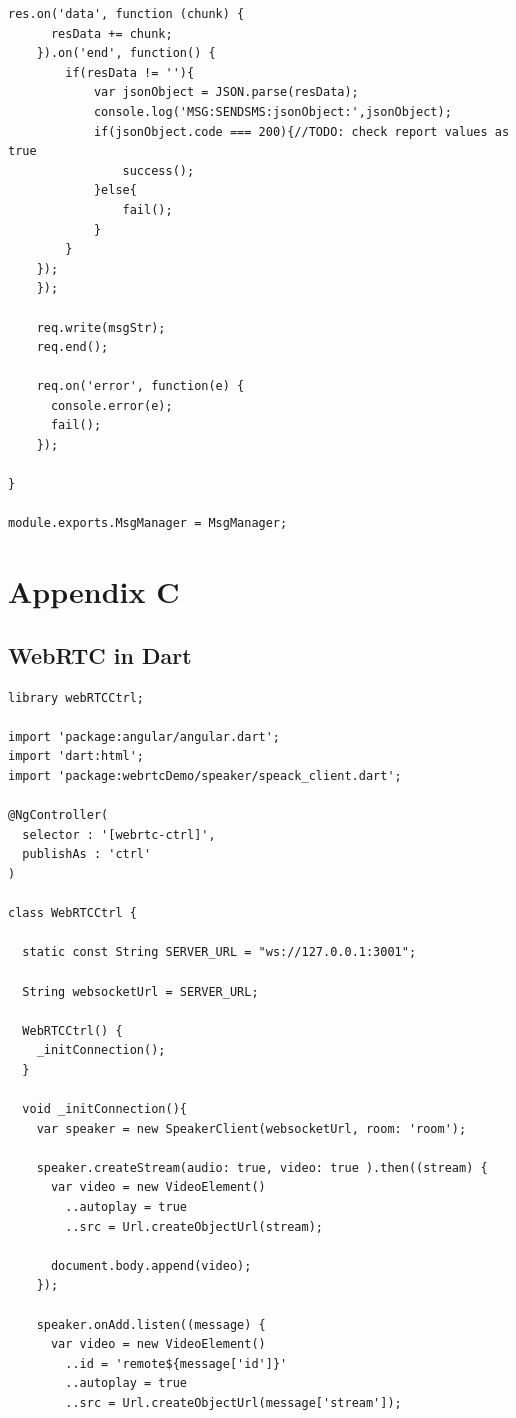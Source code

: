 \begin{appendices}
\begin{lstlisting}[caption={msg.js on Application Server},label={code:msg}]
	  res.on('data', function (chunk) {
      resData += chunk;
    }).on('end', function() {
    	if(resData != ''){
    		var jsonObject = JSON.parse(resData);
    		console.log('MSG:SENDSMS:jsonObject:',jsonObject);
    		if(jsonObject.code === 200){//TODO: check report values as true
    			success();
    		}else{
    			fail();
    		}
    	}
    });
	});

	req.write(msgStr);
	req.end();

	req.on('error', function(e) {
	  console.error(e);
	  fail();
	});

}

module.exports.MsgManager = MsgManager;
\end{lstlisting}

\chapter{Appendix C}

\section{WebRTC in Dart} 
\label{research:dart_webrtcctrl}

\begin{lstlisting}[caption={WebRTCCtrl in Dart application client},label={code:dart_webrtcctrl}]
library webRTCCtrl;

import 'package:angular/angular.dart';
import 'dart:html';
import 'package:webrtcDemo/speaker/speack_client.dart';

@NgController(
  selector : '[webrtc-ctrl]',
  publishAs : 'ctrl'
)

class WebRTCCtrl {

  static const String SERVER_URL = "ws://127.0.0.1:3001";

  String websocketUrl = SERVER_URL;

  WebRTCCtrl() {
    _initConnection();
  }

  void _initConnection(){
    var speaker = new SpeakerClient(websocketUrl, room: 'room');

    speaker.createStream(audio: true, video: true ).then((stream) {
      var video = new VideoElement()
        ..autoplay = true
        ..src = Url.createObjectUrl(stream);

      document.body.append(video);
    });

    speaker.onAdd.listen((message) {
      var video = new VideoElement()
        ..id = 'remote${message['id']}'
        ..autoplay = true
        ..src = Url.createObjectUrl(message['stream']);


\end{lstlisting}
\end{appendices}
